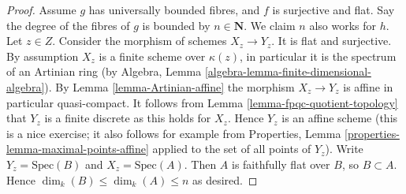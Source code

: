 \begin{proof}
Assume $g$ has universally bounded fibres, and $f$ is surjective and flat.
Say the degree of the fibres of $g$ is bounded by $n \in \mathbf{N}$.
We claim $n$ also works for $h$.
Let $z \in Z$. Consider the morphism of schemes $X_z \to Y_z$.
It is flat and surjective. By assumption $X_z$ is a finite scheme
over $\kappa(z)$, in particular it is the spectrum of an
Artinian ring (by
Algebra, Lemma \ref{algebra-lemma-finite-dimensional-algebra}).
By Lemma \ref{lemma-Artinian-affine} the morphism $X_z \to Y_z$ is affine
in particular quasi-compact. It follows from
Lemma \ref{lemma-fpqc-quotient-topology}
that $Y_z$ is a finite discrete as this holds for $X_z$.
Hence $Y_z$ is an affine scheme (this is a nice exercise; it also follows
for example from
Properties, Lemma \ref{properties-lemma-maximal-points-affine}
applied to the set of all points of $Y_z$).
Write $Y_z = \text{Spec}(B)$ and $X_z = \text{Spec}(A)$.
Then $A$ is faithfully flat over $B$, so $B \subset A$.
Hence $\dim_k(B) \leq \dim_k(A) \leq n$ as desired.
\end{proof}














